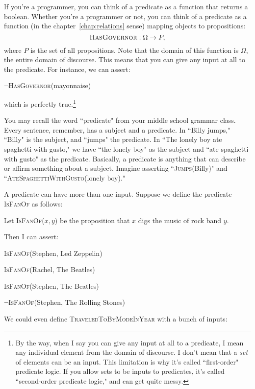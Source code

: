 If you're a programmer, you can think of a predicate as a function that
returns a boolean. Whether you're a programmer or not, you can think of a
predicate as a function (in the chapter~\ref{chap:relations} sense) mapping
objects to propositions:
\[
\textsc{HasGovernor} : \Omega \rightarrow P,
\]
where $P$ is the set of all propositions. Note that the domain of this
function is $\Omega$, the entire domain of discourse. This means that you
can give any input at all to the predicate. For instance, we can assert:
\begin{center}
$\neg$\textsc{HasGovernor}(mayonnaise)
\end{center}
which is perfectly true.\footnote{By the way, when I say you can give any
input at all to a predicate, I mean any individual element from the domain
of discourse. I don't mean that a \textit{set} of elements can be an input.
This limitation is why it's called ``first-order" predicate logic.  If you
allow sets to be inputs to predicates, it's called ``second-order predicate
logic," and can get quite messy.} 

You may recall the word ``predicate" from your middle school grammar class.
Every sentence, remember, has a subject and a predicate. In ``Billy jumps,"
``Billy" is the subject, and ``jumps" the predicate. In ``The lonely boy ate
spaghetti with gusto," we have ``the lonely boy" as the subject and ``ate
spaghetti with gusto" as the predicate. Basically, a predicate is anything that
can describe or affirm something about a subject. Imagine asserting
``\textsc{Jumps}(Billy)" and ``\textsc{AteSpaghettiWithGusto}(lonely boy)."

A predicate can have more than one input. Suppose we define the predicate
\textsc{IsFanOf} as follows:

\quad\quad Let \textsc{IsFanOf}($x,y$) be the proposition that $x$ digs the music of rock band $y$.

Then I can assert:
\begin{center}
\textsc{IsFanOf}(Stephen, Led Zeppelin)

\textsc{IsFanOf}(Rachel, The Beatles)

\textsc{IsFanOf}(Stephen, The Beatles)

$\neg$\textsc{IsFanOf}(Stephen, The Rolling Stones)
\end{center}
We could even define \textsc{TraveledToByModeInYear} with a bunch of inputs:

